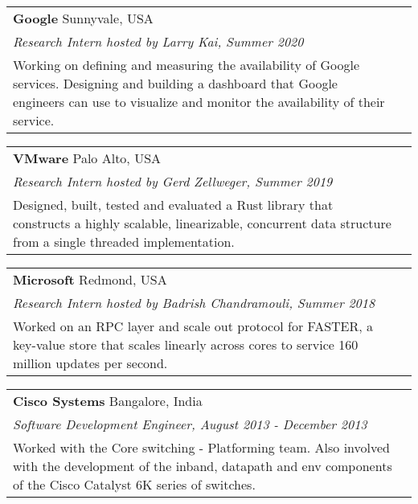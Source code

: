 \documentclass[margin,line]{res}
\begin{document}
\begin{resume}
\begin{tabular}{@{}p{5.5in}p{4in}}
{\bf Google} \dotfill Sunnyvale, USA \\
{\small\em Research Intern hosted by Larry Kai, Summer 2020}\\
{\small Working on defining and measuring the availability of Google
services. Designing and building a dashboard that Google engineers
can use to visualize and monitor the availability of their service.}
\end{tabular}

\vspace{-2.5pt}
\begin{tabular}{@{}p{5.5in}p{4in}}
{\bf VMware} \dotfill Palo Alto, USA \\
{\small\em Research Intern hosted by Gerd Zellweger, Summer 2019}\\
{\small
Designed,
built, tested and evaluated a Rust library that constructs a highly scalable, linearizable,
concurrent data
structure from a single threaded implementation.}
\end{tabular}

\vspace{-2.5pt}
\begin{tabular}{@{}p{5.5in}p{4in}}
{\bf Microsoft} \dotfill Redmond, USA \\
{\small\em Research Intern hosted by Badrish Chandramouli, Summer 2018}\\
{\small Worked on an RPC layer and scale out protocol for FASTER, a
key-value store that scales linearly across cores to service 160 million
updates per second.}
\end{tabular}

\vspace{-2.5pt}
\begin{tabular}{@{}p{5.5in}p{4in}}
{\bf Cisco Systems} \dotfill Bangalore, India \\
{\small\em Software Development Engineer, August 2013 - December 2013}\\
{\small Worked with the Core switching - Platforming team. Also involved with the
development of the inband, datapath and env components of the
Cisco Catalyst 6K series of switches.}
\end{tabular}



\end{resume}
\end{document}
